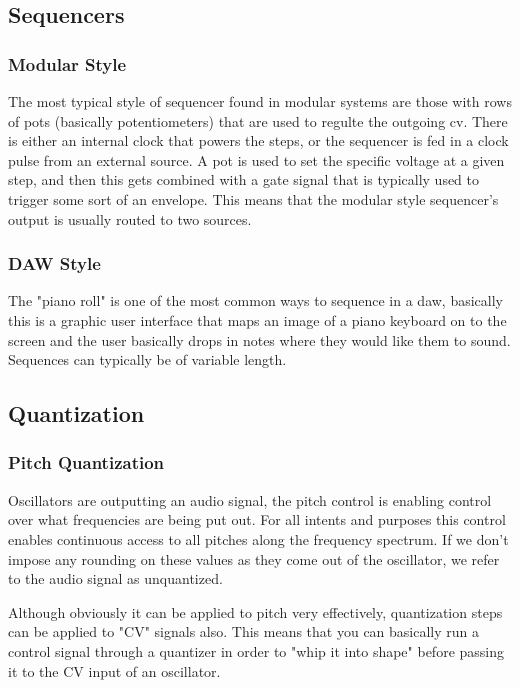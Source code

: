 \documentclass[11pt]{article}
\begin{document}
\subsection{Sequencers}
\label{sec:org806b47c}
\subsubsection{Modular Style}
\label{sec:orgf84e064}
The most typical style of sequencer found in modular systems are those
with rows of pots (basically potentiometers) that are used to regulte
the outgoing cv. There is either an internal clock that powers the
steps, or the sequencer is fed in a clock pulse from an external
source. 
A pot is used to set the specific voltage at a given step, and then
this gets combined with a gate signal that is typically used to
trigger some sort of an envelope. This means that the modular style
sequencer's output is usually routed to two sources. 

\subsubsection{DAW Style}
\label{sec:orgeda4b4a}
The "piano roll" is one of the most common ways to sequence in a daw,
basically this is a graphic user interface that maps an image of a
piano keyboard on to the screen and the user basically drops in notes
where they would like them to sound. Sequences can typically be of
variable length.


\subsection{Quantization}
\label{sec:orga130760}
\subsubsection{Pitch Quantization}
\label{sec:orgdca9506}

Oscillators are outputting an audio signal, the pitch control is
enabling control over what frequencies are being put out. For all
intents and purposes this control enables continuous access to all
pitches along the frequency spectrum. If we don't impose any rounding
on these values as they come out of the oscillator, we refer to the
audio signal as unquantized. 

Although obviously it can be applied to pitch very effectively,
quantization steps can be applied to "CV" signals also. This means
that you can basically run a control signal through a quantizer in
order to "whip it into shape" before passing it to the CV input of an
oscillator. 
\end{document}
